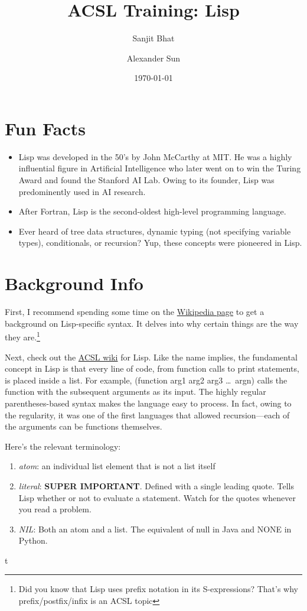 \documentclass[11pt,letterpaper]{article}
\title{ACSL Training: Lisp}
\author{Sanjit Bhat \and Alexander Sun}
\date{\today}
\begin{document}
    \maketitle
    \section{Fun Facts}
    \begin{itemize}
        \item Lisp was developed in the 50's by John McCarthy at MIT.
        He was a highly influential figure in Artificial Intelligence who later
        went on to win the Turing Award and found the Stanford AI Lab.
        Owing to its founder, Lisp was predominently used in AI research.
        \item After Fortran, Lisp is the second-oldest high-level programming language.
        \item Ever heard of tree data structures, dynamic typing (not specifying variable types), conditionals, or recursion?
        Yup, these concepts were pioneered in Lisp.
    \end{itemize}

    \section{Background Info}
    First, I recommend spending some time on the
    \href{https://en.wikipedia.org/wiki/Lisp_(programming_language)#Syntax_and_semantics}{Wikipedia page} to get a background on Lisp-specific syntax.
    It delves into why certain things are the way they are.\footnote{Did
    you know that Lisp uses prefix notation in its S-expressions?
    That's why prefix/postfix/infix is an ACSL topic}

    Next, check out the \href{http://www.categories.acsl.org/wiki/index.php?title=LISP}{ACSL wiki} for Lisp.
    Like the name implies, the fundamental concept in Lisp is that every
    line of code, from function calls to print statements,
    is placed inside a list.
    For example, (function arg1 arg2 arg3 \ldots~argn)
    calls the function with the subsequent arguments as its input.
    The highly regular parentheses-based syntax makes the language
    easy to process.
    In fact, owing to the regularity, it was one of the first languages
    that allowed recursion---each of the arguments can be
    functions themselves.

    Here's the relevant terminology:
    \begin{enumerate}
        \item \textit{atom}: an individual list element that is not a list itself
        \item \textit{literal}: \textbf{SUPER IMPORTANT}.
        Defined with a single leading quote.
        Tells Lisp whether or not to evaluate a statement.
        Watch for the quotes whenever you read a problem.
        \item \textit{NIL}: Both an atom and a list.
        The equivalent of null in Java and NONE in Python.
    \end{enumerate}
t
\end{document}
